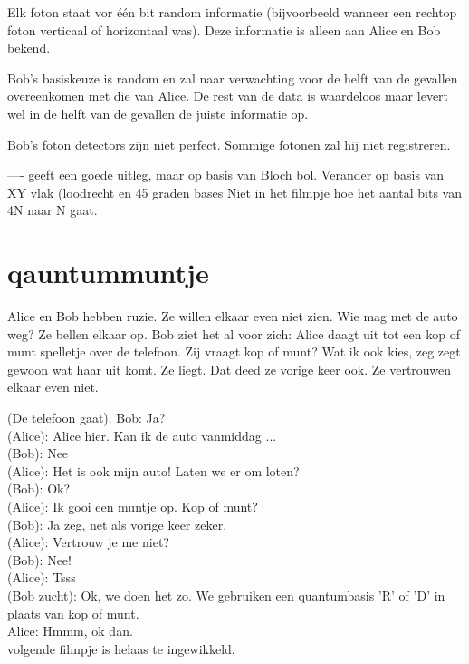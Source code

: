 \documentclass[../../main.tex]{subfiles}
\begin{document}
Elk foton staat vor \'e\'en bit random informatie (bijvoorbeeld wanneer een rechtop foton verticaal of horizontaal was). Deze informatie is alleen aan Alice en Bob bekend.


Bob's basiskeuze is random en zal naar verwachting voor de helft van de gevallen overeenkomen met die van Alice. De rest van de data is waardeloos maar levert wel in de helft van de gevallen de juiste informatie op.

Bob's foton detectors zijn niet perfect. Sommige fotonen zal hij niet registreren.

----
 geeft een goede uitleg, maar op basis van Bloch bol.
Verander op basis van XY vlak (loodrecht en 45 graden bases 
Niet in het filmpje hoe het aantal bits van 4N naar N gaat.
\fi%

\section{qauntummuntje}
Alice en Bob hebben ruzie. Ze willen elkaar even niet zien. Wie mag met de auto weg? Ze bellen elkaar op. Bob ziet het al voor zich:
Alice daagt uit tot een kop of munt spelletje over de telefoon. Zij vraagt kop of munt? Wat ik ook kies, zeg zegt gewoon wat haar uit komt. Ze liegt. Dat deed ze vorige keer ook. Ze vertrouwen elkaar even niet.

(De telefoon gaat). Bob: Ja?\\
(Alice): Alice hier. Kan ik de auto vanmiddag ...\\
(Bob): Nee\\
(Alice): Het is ook mijn auto! Laten we er om loten?\\
(Bob): Ok?\\
(Alice): Ik gooi een muntje op. Kop of munt?\\
(Bob): Ja zeg, net als vorige keer zeker.\\
(Alice): Vertrouw je me niet?\\
(Bob): Nee!\\
(Alice): Tsss\\
(Bob zucht): Ok, we doen het zo. We gebruiken een quantumbasis 'R' of 'D' in plaats van kop of munt.\\
Alice: Hmmm, ok dan.\\
 

volgende filmpje is helaas te ingewikkeld. 
\end{document}
